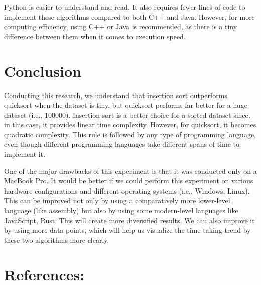\documentclass[twocolumn]{article}
\begin{document}
Python is easier to understand and read. It also requires fewer lines of code to implement these algorithms compared to both C++ and Java. However, for more computing efficiency, using C++ or Java is recommended, as there is a tiny difference between them when it comes to execution speed.
\vspace{100pt}


\section{Conclusion}
Conducting this research, we understand that insertion sort outperforms quicksort when the dataset is tiny, but quicksort performs far better for a huge dataset (i.e., 100000). Insertion sort is a better choice for a sorted dataset since, in this case, it provides linear time complexity. However, for quicksort, it becomes quadratic complexity. This rule is followed by any type of programming language, even though different programming languages take different spans of time to implement it.

One of the major drawbacks of this experiment is that it was conducted only on a MacBook Pro. It would be better if we could perform this experiment on various hardware configurations and different operating systems (i.e., Windows, Linux). This can be improved not only by using a comparatively more lower-level language (like assembly) but also by using some modern-level languages like JavaScript, Rust. This will create more diversified results. We can also improve it by using more data points, which will help us visualize the time-taking trend by these two algorithms more clearly.
\section{References:}






\end{document}
